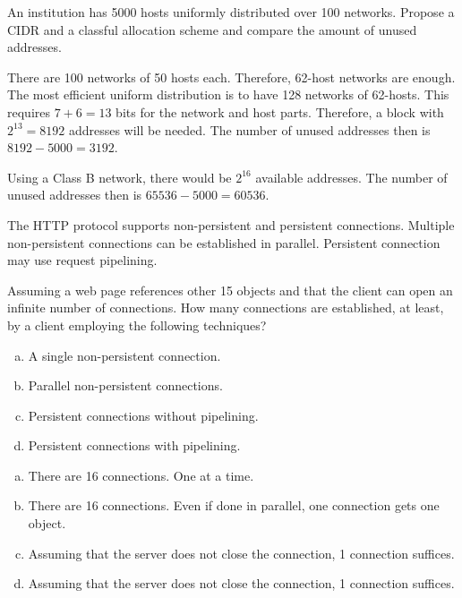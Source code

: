 \begin{Exercise}
An institution has 5000 hosts uniformly distributed over 100 networks.
Propose a CIDR and a classful allocation scheme and compare the amount of unused addresses.
\end{Exercise}
\begin{Answer}
There are 100 networks of 50 hosts each. Therefore, 62-host networks are enough.
The most efficient uniform distribution is to have 128 networks of 62-hosts.
This requires \(7 + 6 = 13\) bits for the network and host parts.
Therefore, a block with \(2^{13} = 8192\) addresses will be needed.
The number of unused addresses then is \(8192 - 5000 = 3192\).

Using a Class B network, there would be \(2^{16}\) available addresses.
The number of unused addresses then is \(65536 - 5000 = 60536\).
\end{Answer}

\begin{Exercise}
The HTTP protocol supports non-persistent and persistent connections.
Multiple non-persistent connections can be established in parallel.
Persistent connection may use request pipelining.

Assuming a web page references other 15 objects and that the client can open an infinite number of connections.
How many connections are established, at least, by a client employing the following techniques?

\begin{enumerate}[a)]
\item A single non-persistent connection.
\item Parallel non-persistent connections.
\item Persistent connections without pipelining.
\item Persistent connections with pipelining.
\end{enumerate}
\end{Exercise}
\begin{Answer}
\begin{enumerate}[a)]
\item There are 16 connections. One at a time.
\item There are 16 connections. Even if done in parallel, one connection gets one object.
\item Assuming that the server does not close the connection, 1 connection suffices.
\item Assuming that the server does not close the connection, 1 connection suffices.
\end{enumerate}

\end{Answer}

